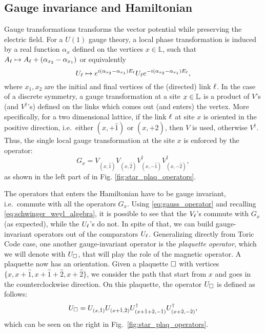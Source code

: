 %
%
\subsection{Gauge invariance and Hamiltonian}%
\label{sub:gauge_invariance_and_hamiltonian}

Gauge transformations transforms the vector potential while preserving the electric field.
For a $U(1)$ gauge theory, a local phase transformation is induced by a real function $\alpha_x$
defined on the vertices $x\in \mathbb L$, such that  $A_{\ell} \mapsto A_{\ell} + (\alpha_{x_2} - \alpha_{x_1})$ or equivalently
\begin{equation}
    U_{\ell} \mapsto
    e^{i(\alpha_{x_2} - \alpha_{x_1}) E_{\ell}}  U_{\ell}   e^{-i(\alpha_{x_2} - \alpha_{x_1} )E_{\ell}},
\end{equation}
where $x_1, x_2$ are the initial and final vertices of the (directed) link $\ell$.
In the case of a discrete symmetry, a gauge transformation at a site $x \in \mathbb{L}$ is a product of $V$'s (and $V^\dagger$'s) defined on the links which comes out (and enters) the vertex.
More specifically, for a two dimensional lattice,
if the link $\ell$ at site $x$ is oriented in the positive direction, i.e.~either $(x, +\hat{1})$ or $(x, +\hat{2})$, then $V$ is used, otherwise $V^\dagger$.
Thus, the single local gauge transformation at the site $x$ is enforced by the operator:
\begin{equation}
    G_x =
    V_{(x, \hat{1})}^{\phantom{\dagger}}
    V_{(x, \hat{2})}^{\phantom{\dagger}}
    V^\dagger_{(x, -\hat{1})}
    V^\dagger_{(x, -\hat{2})},
    \label{eq:gauss_operator}
\end{equation}
as shown in the left part of in Fig. \ref{fig:star_plaq_operators}.

The operators that enters the Hamiltonian have to be gauge invariant, i.e.~commute with all the operators $G_x$.
Using \eqref{eq:gauss_operator} and recalling \eqref{eq:schwinger_weyl_algebra}, it is possible to see that the $V_\ell$'s commute with $G_x$ (as expected), while the $U_\ell$'s do not.
In spite of that, we can build gauge-invariant operators out of the comparators $U_\ell$.
Generalizing directly from Toric Code case, one another gauge-invariant operator is the \emph{plaquette operator}, which we will denote with $U_{\square}$, that will play the role of the magnetic operator.
A plaquette now has an orientation.
Given a plaquette $\square$ with vertices $\{x, x+\hat{1}, x+\hat{1}+\hat{2}, x+\hat{2}\}$, we consider the path that start from $x$ and goes in the counterclockwise direction.
On this plaquette, the operator $U_{\square}$ is defined as follows:
\begin{equation}
    U_{\square} =
    U_{(x, \hat{1})}
    U_{(x + \hat{1}, \hat{2})}
    U_{(x + \hat{1} + \hat{2}, -\hat{1})}^\dagger
    U_{(x + \hat{2}, -\hat{2})}^\dagger,
    \label{eq:plaq_operator}
\end{equation}
which can be seen on the right in Fig.~\ref{fig:star_plaq_operators}.

